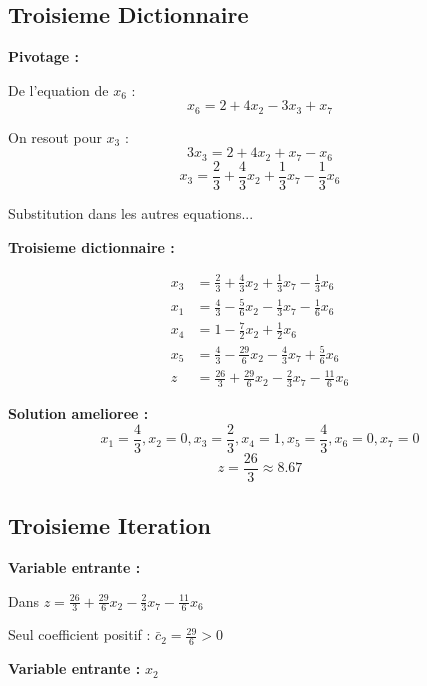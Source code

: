 \documentclass[12pt,a4paper]{article}
\begin{document}
\newpage
\subsection{Troisieme Dictionnaire}

\begin{methode}
\textbf{Pivotage :}

De l'equation de $x_6$ :
$$x_6 = 2 + 4x_2 - 3x_3 + x_7$$

On resout pour $x_3$ :
$$3x_3 = 2 + 4x_2 + x_7 - x_6$$
$$x_3 = \frac{2}{3} + \frac{4}{3}x_2 + \frac{1}{3}x_7 - \frac{1}{3}x_6$$

Substitution dans les autres equations...
\end{methode}

\begin{exemple}
\textbf{Troisieme dictionnaire :}

\begin{align*}
x_3 &= \frac{2}{3} + \frac{4}{3}x_2 + \frac{1}{3}x_7 - \frac{1}{3}x_6\\
x_1 &= \frac{4}{3} - \frac{5}{6}x_2 - \frac{1}{3}x_7 - \frac{1}{6}x_6\\
x_4 &= 1 - \frac{7}{2}x_2 + \frac{1}{2}x_6\\
x_5 &= \frac{4}{3} - \frac{29}{6}x_2 - \frac{4}{3}x_7 + \frac{5}{6}x_6\\
z &= \frac{26}{3} + \frac{29}{6}x_2 - \frac{2}{3}x_7 - \frac{11}{6}x_6
\end{align*}

\textbf{Solution amelioree :} 
$$x_1 = \frac{4}{3}, x_2 = 0, x_3 = \frac{2}{3}, x_4 = 1, x_5 = \frac{4}{3}, x_6 = 0, x_7 = 0$$
$$z = \frac{26}{3} \approx 8.67$$
\end{exemple}

\newpage
\subsection{Troisieme Iteration}

\begin{methode}
\textbf{Variable entrante :}

Dans $z = \frac{26}{3} + \frac{29}{6}x_2 - \frac{2}{3}x_7 - \frac{11}{6}x_6$

Seul coefficient positif : $\bar{c}_2 = \frac{29}{6} > 0$

\textbf{Variable entrante :} $x_2$
\end{methode}
\end{document}
